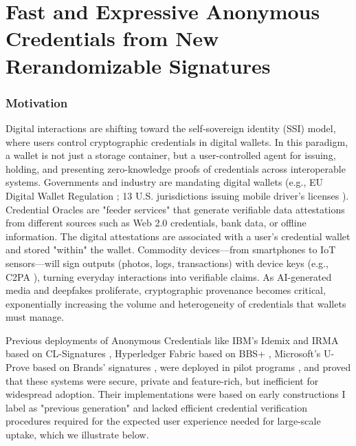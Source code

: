 \chapter{Fast and Expressive Anonymous Credentials from New Rerandomizable Signatures}\label{chap2}


\subsection{Motivation}

Digital interactions are shifting toward the self‑sovereign identity (SSI) model, where users control cryptographic credentials in digital wallets. In this paradigm, a wallet is not just a storage container, but a user-controlled agent for issuing, holding, and presenting zero-knowledge proofs of credentials across interoperable systems. Governments and industry are mandating digital wallets (e.g., EU Digital Wallet Regulation \cite{noauthor_regulation_2024}; 13 U.S. jurisdictions issuing mobile driver’s licenses \cite{aamva_jurisdiction_nodate}). Credential Oracles \cite{zhang_deco_2020, celi_distefano_2025} are "feeder services" that generate verifiable data attestations from different sources such as Web 2.0 credentials, bank data, or offline information.  The digital attestations are associated with a user's credential wallet and stored "within" the wallet. Commodity devices—from smartphones to IoT sensors—will sign outputs (photos, logs, transactions) with device keys (e.g., C2PA \cite{c2paorg_content_2024}), turning everyday interactions into verifiable claims. As AI-generated media and deepfakes proliferate, cryptographic provenance becomes critical, exponentially increasing the volume and heterogeneity of credentials that wallets must manage.


Previous deployments of Anonymous Credentials like IBM's Idemix \cite{camenisch_design_2002} and IRMA \cite{fischer-hubner_towards_2013} based on CL-Signatures \cite{camenisch_design_2002, cimato_signature_2003}, Hyperledger Fabric \cite{androulaki_hyperledger_2018} based on BBS+ \cite{hutchison_constant-size_2006}, Microsoft's U-Prove \cite{dunkelman_formal_2016} based on Brands' signatures \cite{brands_rethinking_2000}, were deployed in pilot programs \cite{dunkelman_formal_2016}, and proved that these systems were secure, private and feature-rich, but inefficient for widespread adoption. Their implementations were based on early constructions I label as "previous generation" and lacked efficient credential verification procedures required for the expected user experience needed for large-scale uptake, which we illustrate below.

